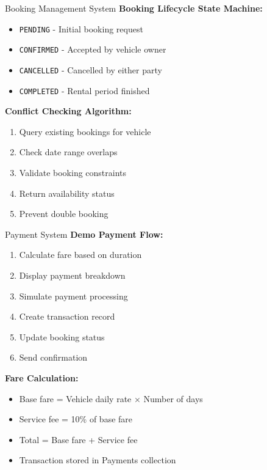 \begin{frame}{Booking Management System}
\textbf{Booking Lifecycle State Machine:}
\begin{itemize}
    \item \texttt{PENDING} - Initial booking request
    \item \texttt{CONFIRMED} - Accepted by vehicle owner
    \item \texttt{CANCELLED} - Cancelled by either party
    \item \texttt{COMPLETED} - Rental period finished
\end{itemize}

\vspace{0.3cm}
\textbf{Conflict Checking Algorithm:}
\begin{enumerate}
    \item Query existing bookings for vehicle
    \item Check date range overlaps
    \item Validate booking constraints
    \item Return availability status
    \item Prevent double booking
\end{enumerate}
\end{frame}

\begin{frame}{Payment System}
\textbf{Demo Payment Flow:}
\begin{enumerate}
    \item Calculate fare based on duration
    \item Display payment breakdown
    \item Simulate payment processing
    \item Create transaction record
    \item Update booking status
    \item Send confirmation
\end{enumerate}

\vspace{0.3cm}
\textbf{Fare Calculation:}
\begin{itemize}
    \item Base fare = Vehicle daily rate × Number of days
    \item Service fee = 10\% of base fare
    \item Total = Base fare + Service fee
    \item Transaction stored in Payments collection
\end{itemize}
\end{frame}

